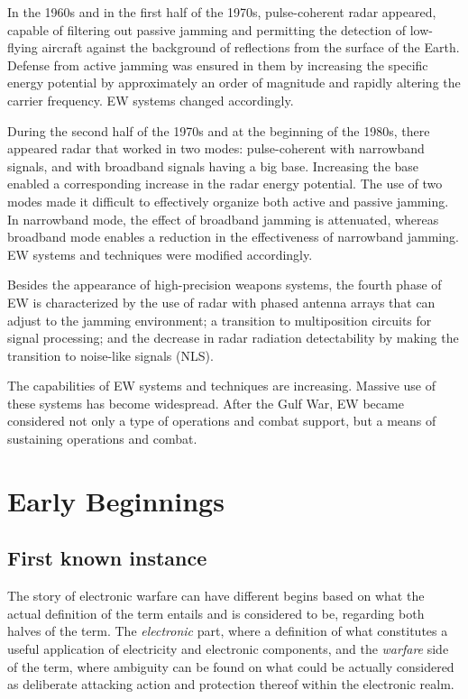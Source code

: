 \documentclass[palatino,english,purist]{ist-report}
\begin{document}
In the 1960s and in the first half of the 1970s, pulse-coherent radar
appeared, capable of filtering out passive jamming and permitting the
detection of low-flying aircraft against the background of reflections from the surface of the Earth. Defense from active jamming was ensured in them by increasing the specific energy potential by approximately an order of magnitude and rapidly altering the carrier frequency. EW systems changed accordingly.

During the second half of the 1970s and at the beginning of the 1980s,
there appeared radar that worked in two modes: pulse-coherent with
narrowband signals, and with broadband signals having a big base.
Increasing the base enabled a corresponding increase in the radar energy potential. The use of two modes made it difficult to effectively organize both active and passive jamming. In narrowband mode, the effect of broadband jamming is attenuated, whereas broadband mode enables a reduction in the effectiveness of narrowband jamming. EW systems and techniques were modified accordingly. 

Besides the appearance of high-precision weapons systems, the fourth phase of EW is characterized by the use of radar with phased antenna arrays that can adjust to the jamming environment; a transition to multiposition circuits for signal processing; and the decrease in radar radiation detectability by making the transition to noise-like signals (NLS).

The capabilities of EW systems and techniques are increasing. Massive
use of these systems has become widespread. After the Gulf War, EW
became considered not only a type of operations and combat support, but a means of sustaining operations and combat.


\section{Early Beginnings} 

\subsection{First known instance}

The story of electronic warfare can have different begins based on what the actual definition of the term entails and is considered to be, regarding both halves of the term. The \emph{electronic} part, where a definition of what constitutes a useful application of electricity and electronic components, and the \emph{warfare} side of the term, where ambiguity can be found on what could be actually considered as deliberate attacking action and protection thereof within the electronic realm.
\end{document}

